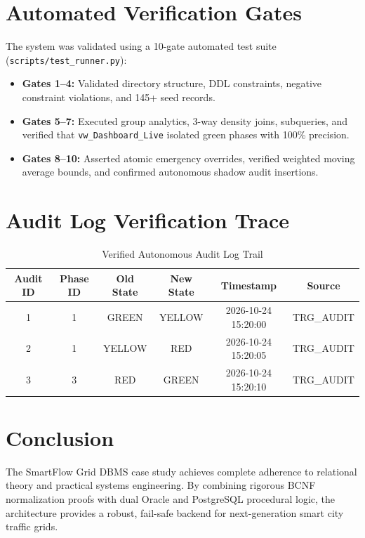 \documentclass[11pt,a4paper]{report}
\begin{document}
\section{Automated Verification Gates}
The system was validated using a 10-gate automated test suite (\texttt{scripts/test\_runner.py}):
\begin{itemize}
    \item \textbf{Gates 1--4:} Validated directory structure, DDL constraints, negative constraint violations, and 145+ seed records.
    \item \textbf{Gates 5--7:} Executed group analytics, 3-way density joins, subqueries, and verified that \texttt{vw\_Dashboard\_Live} isolated green phases with 100\% precision.
    \item \textbf{Gates 8--10:} Asserted atomic emergency overrides, verified weighted moving average bounds, and confirmed autonomous shadow audit insertions.
\end{itemize}

\section{Audit Log Verification Trace}
\begin{table}[ht]
\centering
\begin{tabular}{cccccc}
\toprule
\textbf{Audit ID} & \textbf{Phase ID} & \textbf{Old State} & \textbf{New State} & \textbf{Timestamp} & \textbf{Source} \\
\midrule
1 & 1 & GREEN & YELLOW & 2026-10-24 15:20:00 & TRG\_AUDIT \\
2 & 1 & YELLOW & RED & 2026-10-24 15:20:05 & TRG\_AUDIT \\
3 & 3 & RED & GREEN & 2026-10-24 15:20:10 & TRG\_AUDIT \\
\bottomrule
\end{tabular}
\caption{Verified Autonomous Audit Log Trail}
\end{table}

\section{Conclusion}
The SmartFlow Grid DBMS case study achieves complete adherence to relational theory and practical systems engineering. By combining rigorous BCNF normalization proofs with dual Oracle and PostgreSQL procedural logic, the architecture provides a robust, fail-safe backend for next-generation smart city traffic grids.
\end{document}
